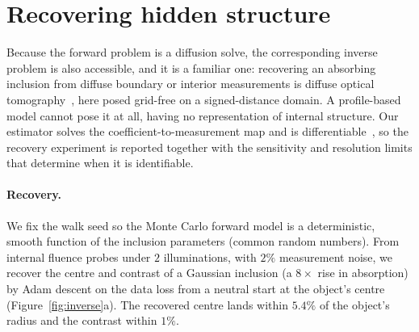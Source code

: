 \documentclass[11pt]{article}
\providecommand{\RInvCentreErr}{0.0}
\providecommand{\RInvContrastErr}{0}
\providecommand{\RInvSrc}{2}
\providecommand{\RInvContrastTrue}{0}
\renewcommand{\RInvCentreErr}{5.4}
\renewcommand{\RInvContrastErr}{1}
\renewcommand{\RInvSrc}{2}
\renewcommand{\RInvContrastTrue}{8}
\begin{document}
\section{Recovering hidden structure}
\label{sec:inverse}
Because the forward problem is a diffusion solve, the corresponding inverse problem is
also accessible, and it is a familiar one: recovering an absorbing inclusion from
diffuse boundary or interior measurements is diffuse optical
tomography~\cite{arridge1999}, here posed grid-free on a signed-distance domain. A
profile-based model cannot pose it at all, having no representation of internal
structure. Our estimator solves the coefficient-to-measurement map and is
differentiable~\cite{miller2024diff,yilmazer2024}, so the recovery experiment is
reported together with the sensitivity and resolution limits that determine when
it is identifiable.

\paragraph{Recovery.}
We fix the walk seed so the Monte Carlo forward model is a deterministic, smooth
function of the inclusion parameters (common random numbers). From internal
fluence probes under $\RInvSrc$ illuminations, with $2\%$ measurement noise, we
recover the centre and contrast of a Gaussian inclusion (a
$\RInvContrastTrue\times$ rise in absorption) by Adam descent on the data loss
from a neutral start at the object's centre (Figure~\ref{fig:inverse}a). The
recovered centre lands within $\RInvCentreErr\%$ of the object's radius and the
contrast within $\RInvContrastErr\%$.
\end{document}
